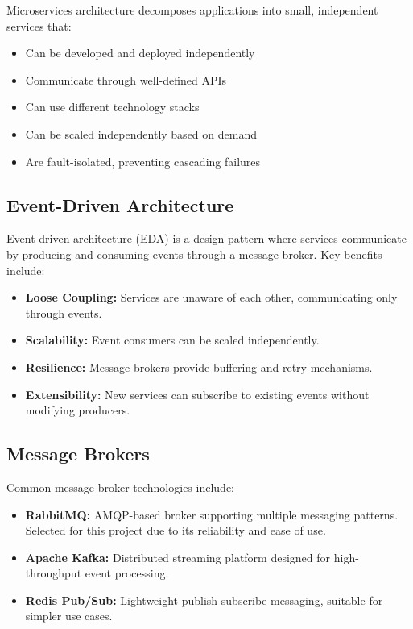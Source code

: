 \documentclass[12pt,a4paper]{report}
\begin{document}
Microservices architecture decomposes applications into small, independent services that:

\begin{itemize}
    \item Can be developed and deployed independently
    \item Communicate through well-defined APIs
    \item Can use different technology stacks
    \item Can be scaled independently based on demand
    \item Are fault-isolated, preventing cascading failures
\end{itemize}

\subsection{Event-Driven Architecture}

Event-driven architecture (EDA) is a design pattern where services communicate by producing and consuming events through a message broker. Key benefits include:

\begin{itemize}
    \item \textbf{Loose Coupling:} Services are unaware of each other, communicating only through events.
    \item \textbf{Scalability:} Event consumers can be scaled independently.
    \item \textbf{Resilience:} Message brokers provide buffering and retry mechanisms.
    \item \textbf{Extensibility:} New services can subscribe to existing events without modifying producers.
\end{itemize}

\subsection{Message Brokers}

Common message broker technologies include:

\begin{itemize}
    \item \textbf{RabbitMQ:} AMQP-based broker supporting multiple messaging patterns. Selected for this project due to its reliability and ease of use.
    \item \textbf{Apache Kafka:} Distributed streaming platform designed for high-throughput event processing.
    \item \textbf{Redis Pub/Sub:} Lightweight publish-subscribe messaging, suitable for simpler use cases.
\end{itemize}
\end{document}
